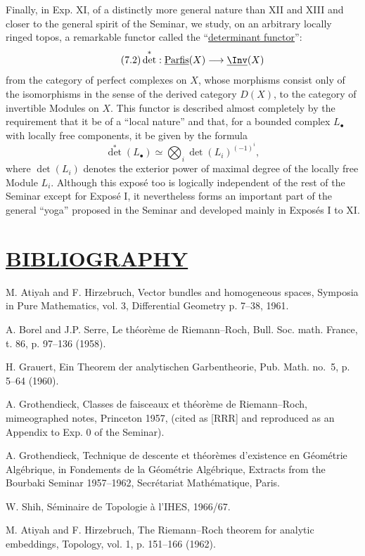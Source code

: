 Finally, in Exp. XI, of a distinctly more general nature than XII and XIII and closer to the general spirit of the Seminar, we study, on an arbitrary locally ringed topos, a remarkable functor called the ``\uline{determinant functor}'':
\begin{equation}\tag{7.2}
\det^*:\underline{\operatorname{Parfis}}(X)\longrightarrow \underline{\Inv}(X)
\end{equation}
from the category of perfect complexes on $X$, whose morphisms consist only of the isomorphisms in the sense of the derived category $D(X)$, to the category of invertible Modules on $X$. This functor is described almost completely by the requirement that it be of a ``local nature'' and that, for a bounded complex $L_\bullet$ with locally free components, it be given by the formula
\begin{equation}\tag{7.3}
\det^*(L_\bullet)\simeq\bigotimes_i \det(L_i)^{(-1)^i},
\end{equation}
where $\det(L_i)$ denotes the exterior power of maximal degree of the locally free Module $L_i$. Although this exposé too is logically independent of the rest of the Seminar except for Exposé I, it nevertheless forms an important part of the general ``yoga'' proposed in the Seminar and developed mainly in Exposés I to XI.

\section*{\underline{BIBLIOGRAPHY}}
\begin{enumerate}[label={[\arabic*]},leftmargin=2.5em]
\item M. Atiyah and F. Hirzebruch, Vector bundles and homogeneous spaces, Symposia in Pure Mathematics, vol. 3, Differential Geometry p. 7--38, 1961.
\item A. Borel and J.P. Serre, Le théorème de Riemann--Roch, Bull. Soc. math. France, t. 86, p. 97--136 (1958).
\item H. Grauert, Ein Theorem der analytischen Garbentheorie, Pub. Math. no.~5, p. 5--64 (1960).
\item A. Grothendieck, Classes de faisceaux et théorème de Riemann--Roch, mimeographed notes, Princeton 1957, (cited as [RRR] and reproduced as an Appendix to Exp. 0 of the Seminar).
\item A. Grothendieck, Technique de descente et théorèmes d'existence en Géométrie Algébrique, in Fondements de la Géométrie Algébrique, Extracts from the Bourbaki Seminar 1957--1962, Secrétariat Mathématique, Paris.
\item W. Shih, Séminaire de Topologie à l'IHES, 1966/67.
\item M. Atiyah and F. Hirzebruch, The Riemann--Roch theorem for analytic embeddings, Topology, vol. 1, p. 151--166 (1962).
\end{enumerate}

\clearpage

